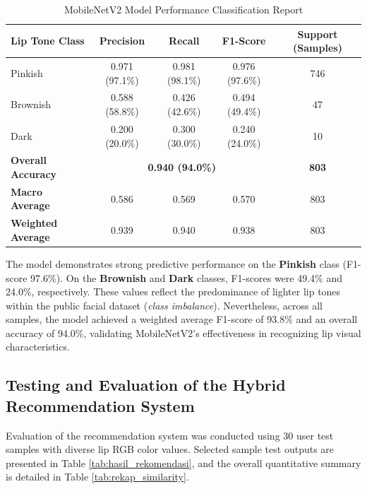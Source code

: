 \documentclass[10pt,a4paper]{article}
\begin{document}
\begin{table}[htbp]
  \centering
  \caption{MobileNetV2 Model Performance Classification Report}
  \label{tab:classification_report}
  \fontsize{8.5pt}{11pt}\selectfont
  \begin{tabular}{lcccc}
    \toprule
    \textbf{Lip Tone Class} & \textbf{Precision} & \textbf{Recall} & \textbf{F1-Score} & \textbf{Support (Samples)} \\
    \midrule
    Pinkish      & 0.971 (97.1\%) & 0.981 (98.1\%) & 0.976 (97.6\%) & 746 \\
    Brownish     & 0.588 (58.8\%) & 0.426 (42.6\%) & 0.494 (49.4\%) & 47  \\
    Dark         & 0.200 (20.0\%) & 0.300 (30.0\%) & 0.240 (24.0\%) & 10  \\
    \midrule
    \textbf{Overall Accuracy} & \multicolumn{3}{c}{\textbf{0.940 (94.0\%)}} & \textbf{803} \\
    \textbf{Macro Average}    & 0.586 & 0.569 & 0.570 & 803 \\
    \textbf{Weighted Average} & 0.939 & 0.940 & 0.938 & 803 \\
    \bottomrule
  \end{tabular}
\end{table}

The model demonstrates strong predictive performance on the \textbf{Pinkish} class (F1-score 97.6\%). On the \textbf{Brownish} and \textbf{Dark} classes, F1-scores were 49.4\% and 24.0\%, respectively. These values reflect the predominance of lighter lip tones within the public facial dataset (\textit{class imbalance}). Nevertheless, across all samples, the model achieved a weighted average F1-score of 93.8\% and an overall accuracy of 94.0\%, validating MobileNetV2's effectiveness in recognizing lip visual characteristics.

\subsection{Testing and Evaluation of the Hybrid Recommendation System}
Evaluation of the recommendation system was conducted using 30 user test samples with diverse lip RGB color values. Selected sample test outputs are presented in Table \ref{tab:hasil_rekomendasi}, and the overall quantitative summary is detailed in Table \ref{tab:rekap_similarity}.
\end{document}
